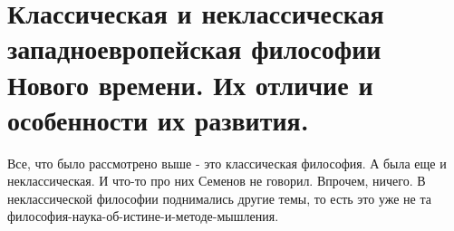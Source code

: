 \section{Классическая и неклассическая западноевропейская философии Нового времени. Их отличие и особенности их развития.}
Все, что было рассмотрено выше - это классическая философия. А была еще и неклассическая. И что-то про них Семенов не говорил. Впрочем, ничего. В неклассической философии поднимались другие темы, то есть это уже не та философия-наука-об-истине-и-методе-мышления.

